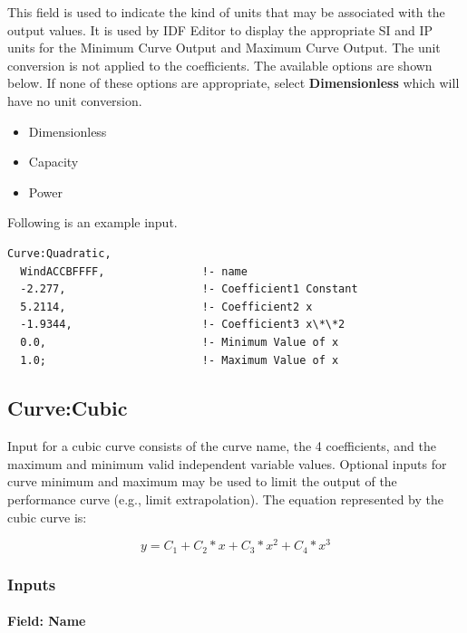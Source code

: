 This field is used to indicate the kind of units that may be associated with the output values. It is used by IDF Editor to display the appropriate SI and IP units for the Minimum Curve Output and Maximum Curve Output. The unit conversion is not applied to the coefficients. The available options are shown below. If none of these options are appropriate, select \textbf{Dimensionless} which will have no unit conversion.

\begin{itemize}
\item
  Dimensionless
\item
  Capacity
\item
  Power
\end{itemize}

Following is an example input.

\begin{lstlisting}
Curve:Quadratic,
  WindACCBFFFF,               !- name
  -2.277,                     !- Coefficient1 Constant
  5.2114,                     !- Coefficient2 x
  -1.9344,                    !- Coefficient3 x\*\*2
  0.0,                        !- Minimum Value of x
  1.0;                        !- Maximum Value of x
\end{lstlisting}

\subsection{Curve:Cubic}\label{curvecubic}

Input for a cubic curve consists of the curve name, the 4 coefficients, and the maximum and minimum valid independent variable values. Optional inputs for curve minimum and maximum may be used to limit the output of the performance curve (e.g., limit extrapolation). The equation represented by the cubic curve is:

\begin{equation}
y = {C_1} + {C_2}*x + {C_3}*{x^2} + {C_4}*{x^3}
\end{equation}

\subsubsection{Inputs}\label{inputs-3-024}

\paragraph{Field: Name}\label{field-name-3-021}

